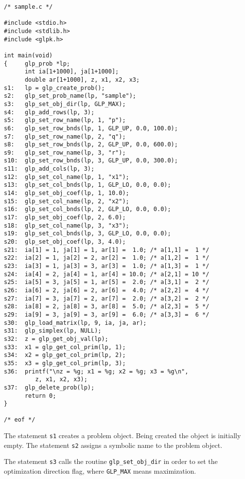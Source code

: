 \begin{footnotesize}
\begin{verbatim}
/* sample.c */

#include <stdio.h>
#include <stdlib.h>
#include <glpk.h>

int main(void)
{     glp_prob *lp;
      int ia[1+1000], ja[1+1000];
      double ar[1+1000], z, x1, x2, x3;
s1:   lp = glp_create_prob();
s2:   glp_set_prob_name(lp, "sample");
s3:   glp_set_obj_dir(lp, GLP_MAX);
s4:   glp_add_rows(lp, 3);
s5:   glp_set_row_name(lp, 1, "p");
s6:   glp_set_row_bnds(lp, 1, GLP_UP, 0.0, 100.0);
s7:   glp_set_row_name(lp, 2, "q");
s8:   glp_set_row_bnds(lp, 2, GLP_UP, 0.0, 600.0);
s9:   glp_set_row_name(lp, 3, "r");
s10:  glp_set_row_bnds(lp, 3, GLP_UP, 0.0, 300.0);
s11:  glp_add_cols(lp, 3);
s12:  glp_set_col_name(lp, 1, "x1");
s13:  glp_set_col_bnds(lp, 1, GLP_LO, 0.0, 0.0);
s14:  glp_set_obj_coef(lp, 1, 10.0);
s15:  glp_set_col_name(lp, 2, "x2");
s16:  glp_set_col_bnds(lp, 2, GLP_LO, 0.0, 0.0);
s17:  glp_set_obj_coef(lp, 2, 6.0);
s18:  glp_set_col_name(lp, 3, "x3");
s19:  glp_set_col_bnds(lp, 3, GLP_LO, 0.0, 0.0);
s20:  glp_set_obj_coef(lp, 3, 4.0);
s21:  ia[1] = 1, ja[1] = 1, ar[1] =  1.0; /* a[1,1] =  1 */
s22:  ia[2] = 1, ja[2] = 2, ar[2] =  1.0; /* a[1,2] =  1 */
s23:  ia[3] = 1, ja[3] = 3, ar[3] =  1.0; /* a[1,3] =  1 */
s24:  ia[4] = 2, ja[4] = 1, ar[4] = 10.0; /* a[2,1] = 10 */
s25:  ia[5] = 3, ja[5] = 1, ar[5] =  2.0; /* a[3,1] =  2 */
s26:  ia[6] = 2, ja[6] = 2, ar[6] =  4.0; /* a[2,2] =  4 */
s27:  ia[7] = 3, ja[7] = 2, ar[7] =  2.0; /* a[3,2] =  2 */
s28:  ia[8] = 2, ja[8] = 3, ar[8] =  5.0; /* a[2,3] =  5 */
s29:  ia[9] = 3, ja[9] = 3, ar[9] =  6.0; /* a[3,3] =  6 */
s30:  glp_load_matrix(lp, 9, ia, ja, ar);
s31:  glp_simplex(lp, NULL);
s32:  z = glp_get_obj_val(lp);
s33:  x1 = glp_get_col_prim(lp, 1);
s34:  x2 = glp_get_col_prim(lp, 2);
s35:  x3 = glp_get_col_prim(lp, 3);
s36:  printf("\nz = %g; x1 = %g; x2 = %g; x3 = %g\n",
         z, x1, x2, x3);
s37:  glp_delete_prob(lp);
      return 0;
}

/* eof */
\end{verbatim}
\end{footnotesize}

The statement \verb|s1| creates a problem object. Being created the
object is initially empty. The statement \verb|s2| assigns a symbolic
name to the problem object.

The statement \verb|s3| calls the routine \verb|glp_set_obj_dir| in
order to set the optimization direction flag, where \verb|GLP_MAX|
means maximization.

